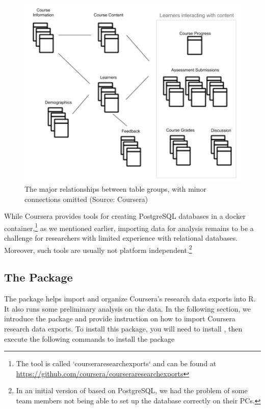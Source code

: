 \begin{figure}[htbp]
    \centering
    \includegraphics[scale=0.5]{datatables}
    \caption{The major relationships between table groups, with minor connections omitted (Source: Coursera)}
    \label{figure:datatables}
\end{figure}

While Coursera provides tools for creating PostgreSQL databases in a
docker
container,\footnote{The tool is called `courseraresearchexports` and can be found at \url{https://github.com/coursera/courseraresearchexports}}
as we mentioned earlier, importing data for analysis remains to be a
challenge for researchers with limited experience with relational
databases. Moreover, such tools are usually not platform
independent.\footnote{In an initial version of  based on PostgreSQL, we had the problem of some team members not being able to set up the database correctly on their PCs.}

\subsection{\texorpdfstring{The 
Package}{The  Package}}\label{the-package}

The  package helps import and organize Coursera's research
data exports into R. It also runs some preliminary analysis on the data.
In the following section, we introduce the package and provide
instruction on how to import Coursera research data exports. To install
this package, you will need to install 
\citep{devtools}, then execute the following commands to install the
 package

